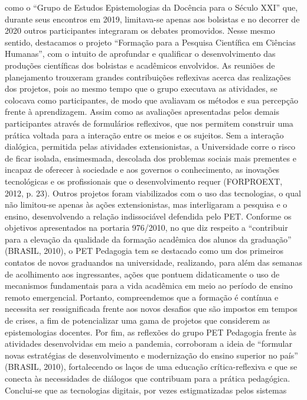 como o “Grupo de Estudos Epistemologias da Docência para o Século XXI” que, durante seus
encontros em 2019, limitava-se apenas aos bolsistas e no decorrer de 2020 outros participantes
integraram os debates promovidos. Nesse mesmo sentido, destacamos o projeto “Formação para
a Pesquisa Científica em Ciências Humanas”, com o intuito de aprofundar e qualificar o
desenvolvimento das produções científicas dos bolsistas e acadêmicos envolvidos.
As reuniões de planejamento trouxeram grandes contribuições reflexivas acerca das
realizações dos projetos, pois ao mesmo tempo que o grupo executava as atividades, se colocava
como participantes, de modo que avaliavam os métodos e sua percepção frente à aprendizagem.
Assim como as avaliações apresentadas pelos demais participantes através de formulários
reflexivos, que nos permitem construir uma prática voltada para a interação entre os meios e os
sujeitos.
Sem a interação dialógica, permitida pelas atividades extensionistas, a Universidade
corre o risco de ficar isolada, ensimesmada, descolada dos problemas sociais mais
prementes e incapaz de oferecer à sociedade e aos governos o conhecimento, as
inovações tecnológicas e os profissionais que o desenvolvimento requer (FORPROEXT,
2012, p. 23).
Outros projetos foram viabilizados com o uso das tecnologias, o qual não limitou-se
apenas às ações extensionistas, mas interligaram a pesquisa e o ensino, desenvolvendo a relação
indissociável defendida pelo PET. Conforme os objetivos apresentados na portaria 976/2010, no
que diz respeito a “contribuir para a elevação da qualidade da formação acadêmica dos alunos da
graduação” (BRASIL, 2010), o PET Pedagogia tem se destacado como um dos primeiros
contatos de novos graduandos na universidade, realizando, para além das semanas de
acolhimento aos ingressantes, ações que pontuem didaticamente o uso de mecanismos
fundamentais para a vida acadêmica em meio ao período de ensino remoto emergencial.
Portanto, compreendemos que a formação é contínua e necessita ser ressignificada frente
aos novos desafios que são impostos em tempos de crises, a fim de potencializar uma gama de
projetos que considerem as epistemologias docentes. Por fim, as reflexões do grupo PET
Pedagogia frente às atividades desenvolvidas em meio a pandemia, corroboram a ideia de
“formular novas estratégias de desenvolvimento e modernização do ensino superior no país”
(BRASIL, 2010), fortalecendo os laços de uma educação crítica-reflexiva e que se conecta às
necessidades de diálogos que contribuam para a prática pedagógica.
Conclui-se que as tecnologias digitais, por vezes estigmatizadas pelos sistemas
